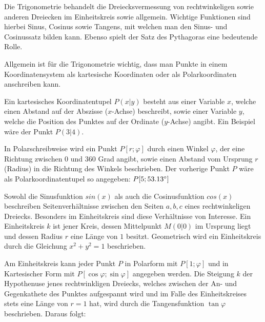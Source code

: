 



\thispagestyle{plain}



Die Trigonometrie behandelt die Dreiecksvermessung von rechtwinkeligen sowie anderen Dreiecken im Einheitskreis sowie allgemein. Wichtige Funktionen sind hierbei Sinus, Cosinus sowie Tangens, mit welchen man den Sinus- und Cosinussatz bilden kann. Ebenso spielt der Satz des Pythagoras eine bedeutende Rolle.


Allgemein ist f\"{u}r die Trigonometrie wichtig, dass man Punkte in einem Koordinatensystem als kartesische Koordinaten oder als Polarkoordinaten anschreiben kann. 

Ein kartesisches Koordinatentupel $P (x | y)$ besteht aus einer Variable $x$, welche einen Abstand auf der Abszisse ($x$-Achse) beschreibt, sowie einer Variable $y$, welche die Position des Punktes auf der Ordinate ($y$-Achse) angibt. Ein Beispiel w\"{a}re der Punkt $P(3 | 4)$.

In Polarschreibweise wird ein Punkt $P [r; \varphi]$ durch einen Winkel $\varphi$, der eine Richtung zwischen $0$ und $360$ Grad angibt, sowie einen Abstand vom Ursprung $r$ (Radius) in die Richtung des Winkels beschrieben. Der vorherige Punkt $P$ w\"{a}re als Polarkoordinatentupel so angegeben: $P [5; 53.13\degree]$


Sowohl die Sinusfunktion $sin(x)$ als auch die Cosinusfunktion $cos(x)$ beschreiben Seitenverh\"{a}ltnisse zwischen den Seiten $a, b, c$ eines rechtwinkeligen Dreiecks. Besonders im Einheitskreis sind diese Verh\"{a}ltnisse von Interesse. Ein Einheitskreis $k$ ist jener Kreis, dessen Mittelpunkt $M (0 | 0)$ im Ursprung liegt und dessen Radius $r$ eine L\"{a}nge von $1$ besitzt. Geometrisch wird ein Einheitskreis durch die Gleichung $x^2 + y^2 = 1$ beschrieben.

Am Einheitskreis kann jeder Punkt $P$ in Polarform mit $P [1;\varphi]$ und in Kartesischer Form mit $P [\cos \varphi; \sin \varphi]$ angegeben werden. Die Steigung $k$ der Hypothenuse jenes rechtwinkligen Dreiecks, welches zwischen der An- und Gegenkathete des Punktes aufgespannt wird und im Falle des Einheitskreises stets eine L\"{a}nge von $r = 1$ hat, wird durch die Tangensfunktion $\tan \varphi$ beschrieben. Daraus folgt:

